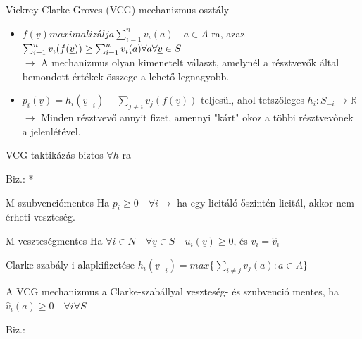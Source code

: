 	\begin{definition}{Vickrey-Clarke-Groves (VCG) mechanizmus osztály}{}
		\begin{itemize}
			\item $f(\underline{v}) maximalizálja \sum_{i=1}^{n} v_i (a) \quad a\in A$-ra, azaz $\sum_{i=1}^{n} v_i (f(\underline{v})) \geq \sum_{i=1}^{n} v_i(a) \\ 
			\forall a \forall \underline{v} \in S$ \\
			$\rightarrow$ A mechanizmus olyan kimenetelt választ, amelynél a résztvevők által bemondott értékek összege a lehető legnagyobb.
			\item $p_i(\underline{v}) = h_i(\underline{v}_{-i}) - \sum_{j \neq i} v_j (f(\underline{v})) $ teljesül, ahol tetszőleges $h_i: S_{-i} \rightarrow \mathbb{R}$ \\
			$\rightarrow$ Minden résztvevő annyit fizet, amennyi "kárt" okoz a többi résztvevőnek a jelenlétével.
		\end{itemize}
	\end{definition}
	
	\begin{theorem}{}{}
		VCG taktikázás biztos $\forall h$-ra
	\end{theorem}
	 Biz.: *
	 
	\begin{definition}{M szubvenciómentes}{}
		Ha $p_i \geq 0 \quad \forall i \rightarrow$  ha egy licitáló őszintén licitál, akkor nem érheti veszteség.
	\end{definition}
	
	\begin{definition}{M veszteségmentes}{}
		Ha $ \forall i \in N \quad \forall \underline{v} \in S \quad u_i(\underline{v}) \geq 0$, és $v_i = \hat{v}_i$
	\end{definition}
	
	\begin{definition}{Clarke-szabály}{}
		 i alapkifizetése $h_i(\underline{v}_{-i}) = max\{ \sum_{i \neq j} v_j(a): a \in A\}$
	\end{definition}
	
	\begin{theorem}{}{}
		A VCG mechanizmus a Clarke-szabállyal veszteség- és szubvenció mentes, ha $\hat{v}_i(a) \geq 0 \quad \forall i \forall S$ 
	\end{theorem}
	Biz.:
	
	\newpage
